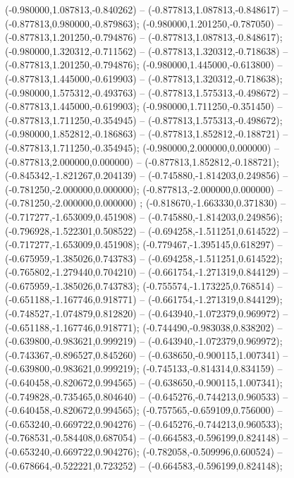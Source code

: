  (-0.980000,1.087813,-0.840262) -- (-0.877813,1.087813,-0.848617) -- (-0.877813,0.980000,-0.879863);
 (-0.980000,1.201250,-0.787050) -- (-0.877813,1.201250,-0.794876) -- (-0.877813,1.087813,-0.848617);
 (-0.980000,1.320312,-0.711562) -- (-0.877813,1.320312,-0.718638) -- (-0.877813,1.201250,-0.794876);
 (-0.980000,1.445000,-0.613800) -- (-0.877813,1.445000,-0.619903) -- (-0.877813,1.320312,-0.718638);
 (-0.980000,1.575312,-0.493763) -- (-0.877813,1.575313,-0.498672) -- (-0.877813,1.445000,-0.619903);
 (-0.980000,1.711250,-0.351450) -- (-0.877813,1.711250,-0.354945) -- (-0.877813,1.575313,-0.498672);
 (-0.980000,1.852812,-0.186863) -- (-0.877813,1.852812,-0.188721) -- (-0.877813,1.711250,-0.354945);
 (-0.980000,2.000000,0.000000) -- (-0.877813,2.000000,0.000000) -- (-0.877813,1.852812,-0.188721);
 (-0.845342,-1.821267,0.204139) -- (-0.745880,-1.814203,0.249856) -- (-0.781250,-2.000000,0.000000);
 (-0.877813,-2.000000,0.000000) -- (-0.781250,-2.000000,0.000000) ;
 (-0.818670,-1.663330,0.371830) -- (-0.717277,-1.653009,0.451908) -- (-0.745880,-1.814203,0.249856);
 (-0.796928,-1.522301,0.508522) -- (-0.694258,-1.511251,0.614522) -- (-0.717277,-1.653009,0.451908);
 (-0.779467,-1.395145,0.618297) -- (-0.675959,-1.385026,0.743783) -- (-0.694258,-1.511251,0.614522);
 (-0.765802,-1.279440,0.704210) -- (-0.661754,-1.271319,0.844129) -- (-0.675959,-1.385026,0.743783);
 (-0.755574,-1.173225,0.768514) -- (-0.651188,-1.167746,0.918771) -- (-0.661754,-1.271319,0.844129);
 (-0.748527,-1.074879,0.812820) -- (-0.643940,-1.072379,0.969972) -- (-0.651188,-1.167746,0.918771);
 (-0.744490,-0.983038,0.838202) -- (-0.639800,-0.983621,0.999219) -- (-0.643940,-1.072379,0.969972);
 (-0.743367,-0.896527,0.845260) -- (-0.638650,-0.900115,1.007341) -- (-0.639800,-0.983621,0.999219);
 (-0.745133,-0.814314,0.834159) -- (-0.640458,-0.820672,0.994565) -- (-0.638650,-0.900115,1.007341);
 (-0.749828,-0.735465,0.804640) -- (-0.645276,-0.744213,0.960533) -- (-0.640458,-0.820672,0.994565);
 (-0.757565,-0.659109,0.756000) -- (-0.653240,-0.669722,0.904276) -- (-0.645276,-0.744213,0.960533);
 (-0.768531,-0.584408,0.687054) -- (-0.664583,-0.596199,0.824148) -- (-0.653240,-0.669722,0.904276);
 (-0.782058,-0.509996,0.600524) -- (-0.678664,-0.522221,0.723252) -- (-0.664583,-0.596199,0.824148);
